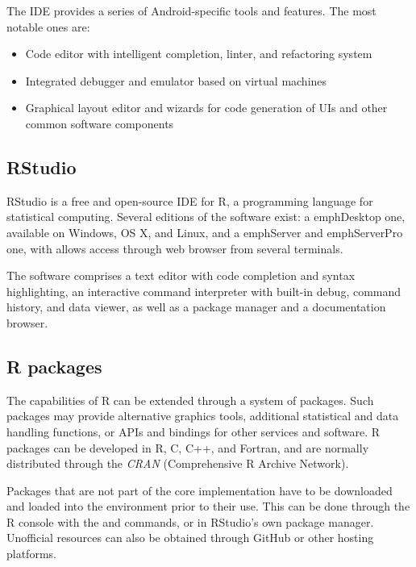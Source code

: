 The IDE provides a series of Android-specific tools and features.
The most notable ones are:

\begin{itemize}
	\item Code editor with intelligent completion, linter, and refactoring system
	\item Integrated debugger and emulator based on virtual machines
	\item Graphical layout editor and wizards for code generation of UIs and other common software components
\end{itemize}



\subsection{RStudio}
RStudio is a free and open-source IDE for R, a programming language for statistical computing.
Several editions of the software exist: a emph{Desktop} one, available on Windows, OS X, and Linux, and a emph{Server} and emph{ServerPro} one, with allows access through web browser from several terminals.

The software comprises a text editor with code completion and syntax highlighting, an interactive command interpreter with built-in debug, command history, and data viewer, as well as a package manager and a documentation browser.



\subsection{R packages}
The capabilities of R can be extended through a system of packages.
Such packages may provide alternative graphics tools, additional statistical and data handling functions, or APIs and bindings for other services and software.
R packages can be developed in R, C, C++, and Fortran, and are normally distributed through the \emph{CRAN} (Comprehensive R Archive Network).

Packages that are not part of the core implementation have to be downloaded and loaded into the environment prior to their use.
This can be done through the R console with the  and  commands, or in RStudio's own package manager.
Unofficial resources can also be obtained through GitHub or other hosting platforms.

